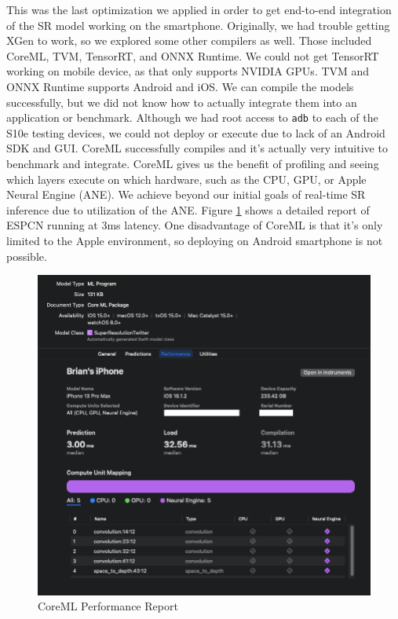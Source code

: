 \documentclass{article}
\begin{document}
This was the last optimization we applied in order to get end-to-end integration of the SR model working on the smartphone. Originally, we had trouble getting XGen to work, so we explored some other compilers as well. Those included CoreML, TVM, TensorRT, and ONNX Runtime. We could not get TensorRT working on mobile device, as that only supports NVIDIA GPUs. TVM and ONNX Runtime supports Android and iOS. We can compile the models successfully, but we did not know how to actually integrate them into an application or benchmark. Although we had root access to \verb|adb| to each of the S10e testing devices, we could not deploy or execute due to lack of an Android SDK and GUI. CoreML successfully compiles and it's actually very intuitive to benchmark and integrate. CoreML gives us the benefit of profiling and seeing which layers execute on which hardware, such as the CPU, GPU, or Apple Neural Engine (ANE). We achieve beyond our initial goals of real-time SR inference due to utilization of the ANE. Figure \ref{fig:coreml} shows a detailed report of ESPCN running at 3ms latency. One disadvantage of CoreML is that it's only limited to the Apple environment, so deploying on Android smartphone is not possible. 

\begin{figure}
    \centerline{\includegraphics[width=5in]{../final/figures/coreml.png}}
    \caption{CoreML Performance Report}
    \label{fig:coreml}
\end{figure}
\end{document}
